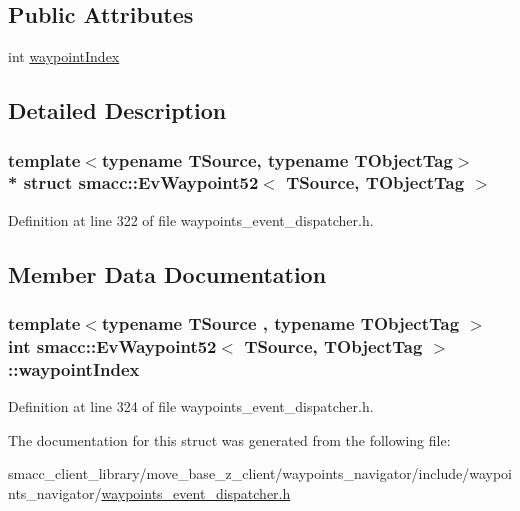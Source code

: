 \subsection*{Public Attributes}
\begin{DoxyCompactItemize}
\item 
int \hyperlink{structsmacc_1_1EvWaypoint52_ac63786ebdb4e65bc74daeeebafb764bc}{waypoint\+Index}
\end{DoxyCompactItemize}


\subsection{Detailed Description}
\subsubsection*{template$<$typename T\+Source, typename T\+Object\+Tag$>$\\*
struct smacc\+::\+Ev\+Waypoint52$<$ T\+Source, T\+Object\+Tag $>$}



Definition at line 322 of file waypoints\+\_\+event\+\_\+dispatcher.\+h.



\subsection{Member Data Documentation}
\subsubsection[{\texorpdfstring{waypoint\+Index}{waypointIndex}}]{\setlength{\rightskip}{0pt plus 5cm}template$<$typename T\+Source , typename T\+Object\+Tag $>$ int {\bf smacc\+::\+Ev\+Waypoint52}$<$ T\+Source, T\+Object\+Tag $>$\+::waypoint\+Index}\hypertarget{structsmacc_1_1EvWaypoint52_ac63786ebdb4e65bc74daeeebafb764bc}{}\label{structsmacc_1_1EvWaypoint52_ac63786ebdb4e65bc74daeeebafb764bc}


Definition at line 324 of file waypoints\+\_\+event\+\_\+dispatcher.\+h.



The documentation for this struct was generated from the following file\+:\begin{DoxyCompactItemize}
\item 
smacc\+\_\+client\+\_\+library/move\+\_\+base\+\_\+z\+\_\+client/waypoints\+\_\+navigator/include/waypoints\+\_\+navigator/\hyperlink{waypoints__event__dispatcher_8h}{waypoints\+\_\+event\+\_\+dispatcher.\+h}\end{DoxyCompactItemize}
